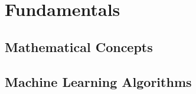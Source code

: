 \chapter{Fundamentals} \label{first_chapter}
\section{Mathematical Concepts}



\section{Machine Learning Algorithms}











